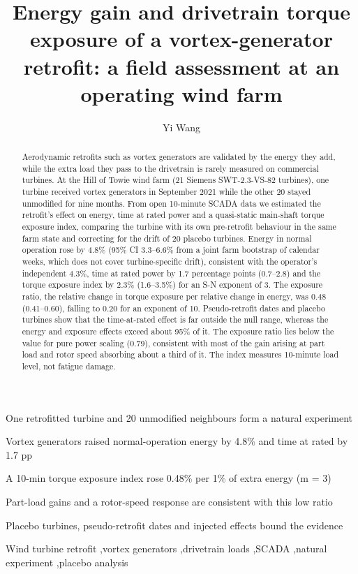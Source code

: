 \documentclass[preprint,12pt]{elsarticle}
\begin{document}
\begin{frontmatter}

\title{Energy gain and drivetrain torque exposure of a vortex-generator retrofit: a field assessment at an operating wind farm}

\author{Yi Wang}

\begin{abstract}
Aerodynamic retrofits such as vortex generators are validated by the energy they add, while the extra load they pass to the drivetrain is rarely measured on commercial turbines. At the Hill of Towie wind farm (21 Siemens SWT-2.3-VS-82 turbines), one turbine received vortex generators in September 2021 while the other 20 stayed unmodified for nine months. From open 10-minute SCADA data we estimated the retrofit's effect on energy, time at rated power and a quasi-static main-shaft torque exposure index, comparing the turbine with its own pre-retrofit behaviour in the same farm state and correcting for the drift of 20 placebo turbines. Energy in normal operation rose by 4.8\% (95\% CI 3.3--6.6\% from a joint farm bootstrap of calendar weeks, which does not cover turbine-specific drift), consistent with the operator's independent 4.3\%, time at rated power by 1.7 percentage points (0.7--2.8) and the torque exposure index by 2.3\% (1.6--3.5\%) for an S-N exponent of 3. The exposure ratio, the relative change in torque exposure per relative change in energy, was 0.48 (0.41--0.60), falling to 0.20 for an exponent of 10. Pseudo-retrofit dates and placebo turbines show that the time-at-rated effect is far outside the null range, whereas the energy and exposure effects exceed about 95\% of it. The exposure ratio lies below the value for pure power scaling (0.79), consistent with most of the gain arising at part load and rotor speed absorbing about a third of it. The index measures 10-minute load level, not fatigue damage.
\end{abstract}

\begin{highlights}
\item One retrofitted turbine and 20 unmodified neighbours form a natural experiment
\item Vortex generators raised normal-operation energy by 4.8\% and time at rated by 1.7 pp
\item A 10-min torque exposure index rose 0.48\% per 1\% of extra energy (m = 3)
\item Part-load gains and a rotor-speed response are consistent with this low ratio
\item Placebo turbines, pseudo-retrofit dates and injected effects bound the evidence
\end{highlights}

\begin{keyword}
Wind turbine retrofit \sep vortex generators \sep drivetrain loads \sep SCADA \sep natural experiment \sep placebo analysis
\end{keyword}

\end{frontmatter}
\end{document}
